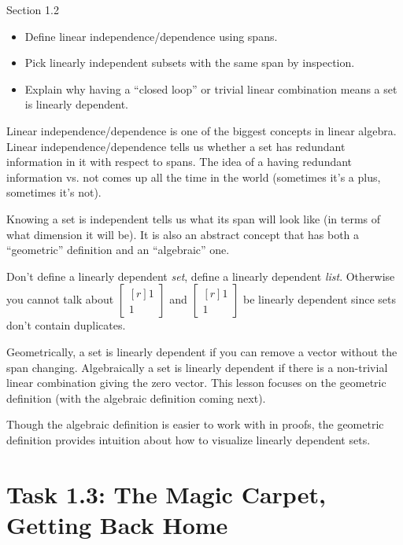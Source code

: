 \documentclass{problemset}
\newcommand{\mat}[1]{\begin{bmatrix*}[r]#1\end{bmatrix*}}
\begin{document}
	
\begin{lesson}
	\newpage

	Section 1.2

	\begin{itemize}
		\item Define linear independence/dependence using spans.
		\item Pick linearly independent subsets with the same span by inspection.
		\item Explain why having a ``closed loop'' or trivial linear combination
			means a set is linearly dependent.
	\end{itemize}

	Linear independence/dependence is one of the biggest concepts in linear algebra. 
	Linear independence/dependence tells us whether a set has redundant information
	in it with respect to spans. The idea of a having redundant information vs\mbox{.}
	not comes up all the time in the world (sometimes it's a plus, sometimes it's not).
	
	Knowing
	a set is independent tells us what its span will look like (in terms of what dimension
	it will be). It is also an abstract concept that has both a ``geometric'' definition
	and an ``algebraic'' one. 
	\begin{annotation}
		\begin{notes}
			Don't define a linearly dependent \emph{set}, define
			a linearly dependent \emph{list}. Otherwise you cannot talk about
			$\mat{1\\1}$ and $\mat{1\\1}$ be linearly dependent since sets don't
			contain duplicates.
		\end{notes}
	\end{annotation}
	Geometrically, a set is linearly dependent if you can remove
	a vector without the span changing. Algebraically a set is linearly dependent if there
	is a non-trivial linear combination giving the zero vector. This lesson focuses on the
	geometric definition (with the algebraic definition coming next).

	Though the algebraic definition is easier to work with in proofs, the geometric definition
	provides intuition about how to visualize linearly
	dependent sets.

	\newpage
\end{lesson}
\newpage
\pagestyle{iola}
\section*{Task 1.3: The Magic Carpet, Getting Back Home}
\end{document}

